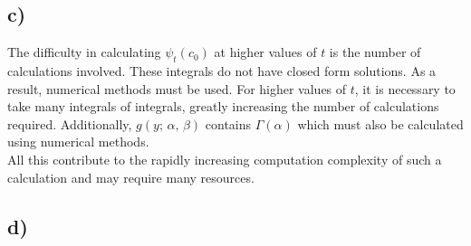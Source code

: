 \documentclass[titlepage]{article}
\begin{document}
	\subsection{c)}
	The difficulty in calculating $\psi_t(c_0)$ at higher values of $t$ is the number of calculations involved. These integrals do not have closed form solutions. As a result, numerical methods must be used. For higher values of $t$, it is necessary to take many integrals of integrals, greatly increasing the number of calculations required. Additionally, $g(y;\,\alpha,\,\beta)$ contains $\Gamma(\alpha)$ which must also be calculated using numerical methods.\\
	All this contribute to the rapidly increasing computation complexity of such a calculation and may require many resources.
	
	\subsection{d)}
\end{document}

